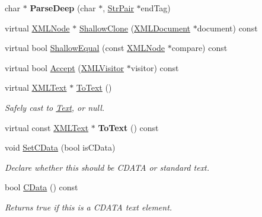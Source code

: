 \begin{DoxyCompactItemize}
char $\ast$ {\bfseries Parse\+Deep} (char $\ast$, \hyperlink{classtinyxml2_1_1StrPair}{Str\+Pair} $\ast$end\+Tag)
\item 
virtual \hyperlink{classtinyxml2_1_1XMLNode}{X\+M\+L\+Node} $\ast$ \hyperlink{classtinyxml2_1_1XMLText_a86d265c93152726c8c6831e9594840e6}{Shallow\+Clone} (\hyperlink{classtinyxml2_1_1XMLDocument}{X\+M\+L\+Document} $\ast$document) const
\item 
virtual bool \hyperlink{classtinyxml2_1_1XMLText_a99d8bce4dc01df889126e047f358cdfc}{Shallow\+Equal} (const \hyperlink{classtinyxml2_1_1XMLNode}{X\+M\+L\+Node} $\ast$compare) const
\item 
virtual bool \hyperlink{classtinyxml2_1_1XMLText_a1b2c1448f1a21299d0a7913f18b55206}{Accept} (\hyperlink{classtinyxml2_1_1XMLVisitor}{X\+M\+L\+Visitor} $\ast$visitor) const
\item 
\mbox{\label{classtinyxml2_1_1XMLText_ab1213b4ddebe9b17ec7e7040e9f1caf7}} 
virtual \hyperlink{classtinyxml2_1_1XMLText}{X\+M\+L\+Text} $\ast$ \hyperlink{classtinyxml2_1_1XMLText_ab1213b4ddebe9b17ec7e7040e9f1caf7}{To\+Text} ()
\begin{DoxyCompactList}\small\item\em Safely cast to \hyperlink{classText}{Text}, or null. \end{DoxyCompactList}\item 
\mbox{\label{classtinyxml2_1_1XMLText_a671ce22c7c5ef378f1ce31e6f827b9e2}} 
virtual const \hyperlink{classtinyxml2_1_1XMLText}{X\+M\+L\+Text} $\ast$ {\bfseries To\+Text} () const
\item 
\mbox{\label{classtinyxml2_1_1XMLText_ad080357d76ab7cc59d7651249949329d}} 
void \hyperlink{classtinyxml2_1_1XMLText_ad080357d76ab7cc59d7651249949329d}{Set\+C\+Data} (bool is\+C\+Data)
\begin{DoxyCompactList}\small\item\em Declare whether this should be C\+D\+A\+TA or standard text. \end{DoxyCompactList}\item 
\mbox{\label{classtinyxml2_1_1XMLText_ac1bb5ea4166c320882d9e0ad16fd385b}} 
bool \hyperlink{classtinyxml2_1_1XMLText_ac1bb5ea4166c320882d9e0ad16fd385b}{C\+Data} () const
\begin{DoxyCompactList}\small\item\em Returns true if this is a C\+D\+A\+TA text element. \end{DoxyCompactList}\item 

\end{DoxyCompactItemize}
